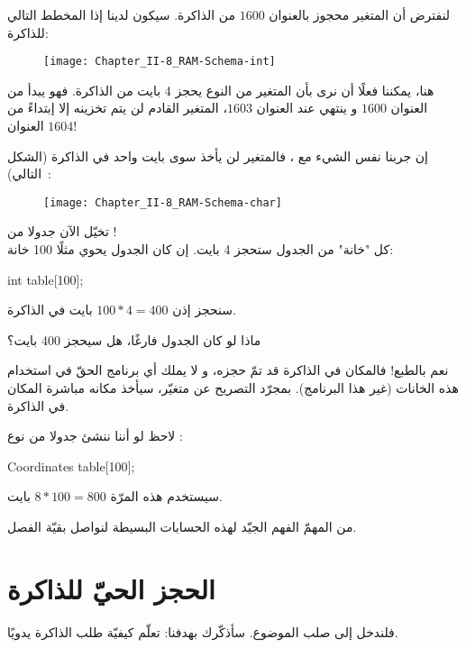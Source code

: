 لنفترض أن المتغير
محجوز بالعنوان
$1600$
من الذاكرة. سيكون لدينا إذا المخطط التالي للذاكرة:

\begin{figure}[H]
	\centering
	\texttt{[image: Chapter\_II-8\_RAM-Schema-int]}
\end{figure}

هنا، يمكننا فعلًا أن نرى بأن المتغير
من النوع
يحجز 4 بايت من الذاكرة.
فهو يبدأ من العنوان
$1600$
و ينتهي عند العنوان
$1603$،
المتغير القادم لن يتم تخزينه إلا إبتداءً من العنوان
$1604$!

إن جربنا نفس الشيء مع
،
فالمتغير لن يأخذ سوى بايت واحد في الذاكرة (الشكل التالي)~:

\begin{figure}[H]
	\centering
	\texttt{[image: Chapter\_II-8\_RAM-Schema-char]}
\end{figure}

تخيّل الآن جدولا من
!\\
كل "خانة" من الجدول ستحجز 4 بايت. إن كان الجدول يحوي مثلًا  100 خانة:

\begin{Csource}
int table[100];
\end{Csource}

سنحجز إذن
$100 * 4 = 400$
بايت في الذاكرة.

\begin{question}
ماذا لو كان الجدول فارغًا، هل سيحجز 400 بايت؟
\end{question}

نعم بالطبع! فالمكان  في الذاكرة قد تمّ حجزه، و لا يملك أي برنامج الحقّ في استخدام هذه الخانات (غير هذا البرنامج). بمجرّد التصريح عن متغيّر، سيأخذ مكانه مباشرة المكان في الذاكرة.

لاحظ لو أننا ننشئ جدولا من نوع
 :

\begin{Csource}
Coordinates table[100];
\end{Csource}

سيستخدم هذه المرّة
$8 * 100 = 800$
بايت.

من المهمّ الفهم الجيّد لهذه الحسابات البسيطة لنواصل بقيّة الفصل.

\section{الحجز الحيّ للذاكرة}

فلندخل إلى صلب الموضوع. سأذكّرك بهدفنا: تعلّم كيفيّة طلب الذاكرة يدويًا.

